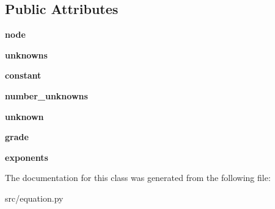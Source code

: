 \subsection*{Public Attributes}
\begin{DoxyCompactItemize}
\item 
\mbox{\label{classsrc_1_1equation_1_1Equation_a8f458f87548078811f4d21c706f88d0e}} 
{\bfseries node}
\item 
\mbox{\label{classsrc_1_1equation_1_1Equation_a38186427bf6e964532dbde7f3f8519be}} 
{\bfseries unknowns}
\item 
\mbox{\label{classsrc_1_1equation_1_1Equation_a24288eb132057dc0dc2bf547f5ab32b3}} 
{\bfseries constant}
\item 
\mbox{\label{classsrc_1_1equation_1_1Equation_a177b39b70a07e6cec9b1a36124e76fe5}} 
{\bfseries number\+\_\+unknowns}
\item 
\mbox{\label{classsrc_1_1equation_1_1Equation_adee9115ac8781878f65753bc132c42d7}} 
{\bfseries unknown}
\item 
\mbox{\label{classsrc_1_1equation_1_1Equation_aa1f7d40ad0e5194c7ab4dad1627b5903}} 
{\bfseries grade}
\item 
\mbox{\label{classsrc_1_1equation_1_1Equation_a2d8654923394a223fbcd206b4ab208f6}} 
{\bfseries exponents}
\end{DoxyCompactItemize}


The documentation for this class was generated from the following file\+:\begin{DoxyCompactItemize}
\item 
src/equation.\+py\end{DoxyCompactItemize}
